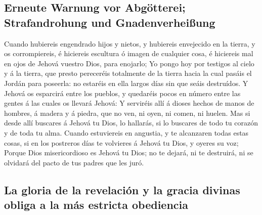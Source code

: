 \hypertarget{erneute-warnung-vor-abguxf6tterei-strafandrohung-und-gnadenverheiuxdfung}{%
\subsection{Erneute Warnung vor Abgötterei; Strafandrohung und
Gnadenverheißung}\label{erneute-warnung-vor-abguxf6tterei-strafandrohung-und-gnadenverheiuxdfung}}

 Cuando hubiereis engendrado hijos y nietos, y hubiereis
envejecido en la tierra, y os corrompiereis, é hiciereis escultura ó
imagen de cualquier cosa, é hiciereis mal en ojos de Jehová vuestro
Dios, para enojarlo;  Yo pongo hoy por testigos al cielo y
á la tierra, que presto pereceréis totalmente de la tierra hacia la cual
pasáis el Jordán para poseerla: no estaréis en ella largos días sin que
seáis destruídos.  Y Jehová os esparcirá entre los pueblos,
y quedaréis pocos en número entre las gentes á las cuales os llevará
Jehová:  Y serviréis allí á dioses hechos de manos de
hombres, á madera y á piedra, que no ven, ni oyen, ni comen, ni huelen.
 Mas si desde allí buscares á Jehová tu Dios, lo hallarás,
si lo buscares de todo tu corazón y de toda tu alma. 
Cuando estuviereis en angustia, y te alcanzaren todas estas cosas, si en
los postreros días te volvieres á Jehová tu Dios, y oyeres su voz;
 Porque Dios misericordioso es Jehová tu Dios; no te
dejará, ni te destruirá, ni se olvidará del pacto de tus padres que les
juró.

\hypertarget{la-gloria-de-la-revelaciuxf3n-y-la-gracia-divinas-obliga-a-la-muxe1s-estricta-obediencia}{%
\subsection{La gloria de la revelación y la gracia divinas obliga a la
más estricta
obediencia}\label{la-gloria-de-la-revelaciuxf3n-y-la-gracia-divinas-obliga-a-la-muxe1s-estricta-obediencia}}

